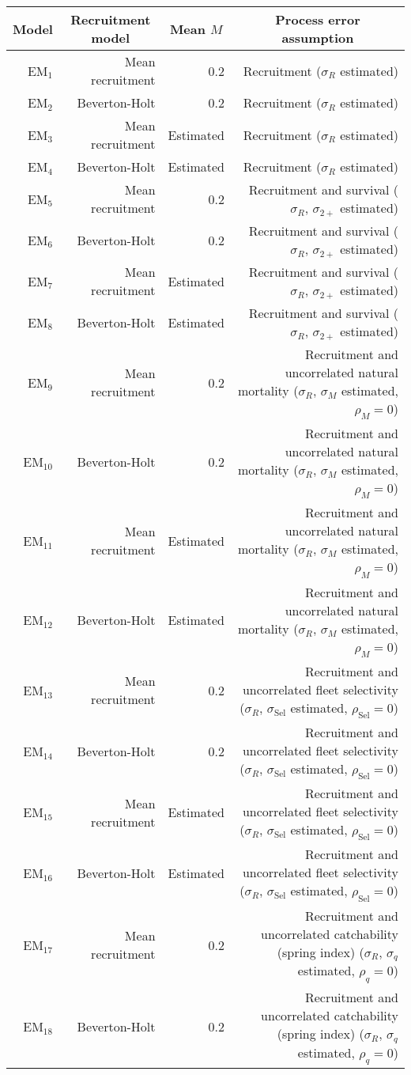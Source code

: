 \begin{center}
\begin{tabular}{rrrr}
\hline\hline
\multicolumn{1}{c}{Model}&\multicolumn{1}{c}{Recruitment model}&\multicolumn{1}{c}{Mean $M$}&\multicolumn{1}{c}{Process error assumption}\tabularnewline
\hline
EM$_{1}$&Mean recruitment&0.2&Recruitment ($\sigma_R$ estimated)\tabularnewline
EM$_{2}$&Beverton-Holt&0.2&Recruitment ($\sigma_R$ estimated)\tabularnewline
EM$_{3}$&Mean recruitment&Estimated&Recruitment ($\sigma_R$ estimated)\tabularnewline
EM$_{4}$&Beverton-Holt&Estimated&Recruitment ($\sigma_R$ estimated)\tabularnewline
EM$_{5}$&Mean recruitment&0.2&Recruitment and survival ($\sigma_R$, $\sigma_{2+}$ estimated)\tabularnewline
EM$_{6}$&Beverton-Holt&0.2&Recruitment and survival ($\sigma_R$, $\sigma_{2+}$ estimated)\tabularnewline
EM$_{7}$&Mean recruitment&Estimated&Recruitment and survival ($\sigma_R$, $\sigma_{2+}$ estimated)\tabularnewline
EM$_{8}$&Beverton-Holt&Estimated&Recruitment and survival ($\sigma_R$, $\sigma_{2+}$ estimated)\tabularnewline
EM$_{9}$&Mean recruitment&0.2&Recruitment and uncorrelated natural mortality ($\sigma_R$, $\sigma_{M}$ estimated, $\rho_{M} = 0$)\tabularnewline
EM$_{10}$&Beverton-Holt&0.2&Recruitment and uncorrelated natural mortality ($\sigma_R$, $\sigma_{M}$ estimated, $\rho_{M} = 0$)\tabularnewline
EM$_{11}$&Mean recruitment&Estimated&Recruitment and uncorrelated natural mortality ($\sigma_R$, $\sigma_{M}$ estimated, $\rho_{M} = 0$)\tabularnewline
EM$_{12}$&Beverton-Holt&Estimated&Recruitment and uncorrelated natural mortality ($\sigma_R$, $\sigma_{M}$ estimated, $\rho_{M} = 0$)\tabularnewline
EM$_{13}$&Mean recruitment&0.2&Recruitment and uncorrelated fleet selectivity ($\sigma_R$, $\sigma_{\text{Sel}}$ estimated, $\rho_{\text{Sel}} = 0$)\tabularnewline
EM$_{14}$&Beverton-Holt&0.2&Recruitment and uncorrelated fleet selectivity ($\sigma_R$, $\sigma_{\text{Sel}}$ estimated, $\rho_{\text{Sel}} = 0$)\tabularnewline
EM$_{15}$&Mean recruitment&Estimated&Recruitment and uncorrelated fleet selectivity ($\sigma_R$, $\sigma_{\text{Sel}}$ estimated, $\rho_{\text{Sel}} = 0$)\tabularnewline
EM$_{16}$&Beverton-Holt&Estimated&Recruitment and uncorrelated fleet selectivity ($\sigma_R$, $\sigma_{\text{Sel}}$ estimated, $\rho_{\text{Sel}} = 0$)\tabularnewline
EM$_{17}$&Mean recruitment&0.2&Recruitment and uncorrelated catchability (spring index) ($\sigma_R$, $\sigma_{q}$ estimated, $\rho_{q} = 0$)\tabularnewline
EM$_{18}$&Beverton-Holt&0.2&Recruitment and uncorrelated catchability (spring index) ($\sigma_R$, $\sigma_{q}$ estimated, $\rho_{q} = 0$)\tabularnewline

\end{tabular}
\end{center}

